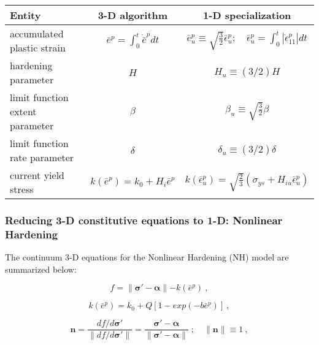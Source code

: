 \documentclass[11pt]{report}
\numberwithin{equation}{section}
\newcommand{\bmf } {\boldsymbol }
\begin{document}
\begin{table}[htb]	
	\centering
		\begin{tabular}{ | l | c |  c | }
		\hline
		Entity & 3-D algorithm & 1-D specialization \\
		\hline \hline
accumulated plastic strain & $\bar e^p = \int^t_0 \dot{\bar e}^p dt$ & 
$\bar e^p_u\equiv \sqrt{\textstyle{\frac{3}{2}}}\bar \epsilon^p_u;\quad 
\bar \epsilon^p_u = \int^t_0 |\dot \epsilon^p_{11}| dt $ \\

hardening parameter & $H$ & $H_{u}\equiv(3/2)H$ \\

limit function extent parameter & $\beta$ & 
$\beta_u\equiv\sqrt{\textstyle{\frac{3}{2}}}\beta$ \\

limit function rate parameter & $\delta$ & $\delta_u\equiv(3/2)\delta$ \\

current yield stress & $k(\bar e^p)=k_0+H_i \bar e^p$ & 
$k \left( \bar \epsilon^p_u \right) = 
\sqrt{ \textstyle {\frac{2}{3}} } 
\left( \sigma_{ys}+
H_{iu} \bar \epsilon^p_u \right)$ \\
\hline
		\end{tabular}
\end{table}


\subsubsection{Reducing 3-D constitutive equations to 1-D: Nonlinear Hardening}
The continuum 3-D equations for the Nonlinear Hardening (NH) model are summarized below:

\begin{equation} \label{E:yield_surface_nh}
f = \parallel \bmf{\sigma}' - \bmf{\alpha} \parallel - k(\bar e^p) ~,
\end{equation}

\begin{equation} \label{E:isotropic_nh}
k(\bar e^p) = k_0+ Q \left [ 1- exp \left( -b \bar e^p \right) \right ]~,
\end{equation}

\begin{equation}\label{E:n_define_nh}
\bmf n =  \frac {df/d\bmf{\sigma}'} {\parallel df/d\bmf{\sigma}' \parallel} =
\frac{\bmf \sigma' - \bmf \alpha} {\parallel \bmf \sigma' - \bmf \alpha \parallel }\;;
\quad \parallel \bmf n \parallel \equiv 1~,
\end{equation}
\end{document}
